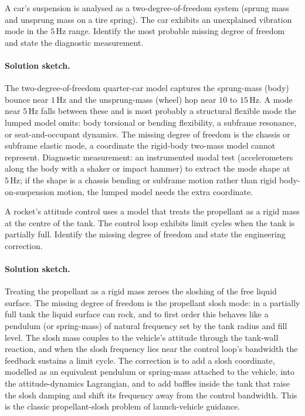 \begin{exercise}
A car's suspension is analysed as a two-degree-of-freedom system
(sprung mass and unsprung mass on a tire spring). The car exhibits an
unexplained vibration mode in the $5\,\si{\hertz}$ range. Identify
the most probable missing degree of freedom and state the
diagnostic measurement.

\paragraph{Solution sketch.} The two-degree-of-freedom quarter-car model
captures the sprung-mass (body) bounce near $1\,\si{\hertz}$ and the
unsprung-mass (wheel) hop near $10$ to $15\,\si{\hertz}$. A mode near
$5\,\si{\hertz}$ falls between these and is most probably a structural
flexible mode the lumped model omits: body torsional or bending
flexibility, a subframe resonance, or seat-and-occupant dynamics. The
missing degree of freedom is the chassis or subframe elastic mode, a
coordinate the rigid-body two-mass model cannot represent. Diagnostic
measurement: an instrumented modal test (accelerometers along the body
with a shaker or impact hammer) to extract the mode shape at
$5\,\si{\hertz}$; if the shape is a chassis bending or subframe motion
rather than rigid body-on-suspension motion, the lumped model needs the
extra coordinate.
\end{exercise}

\begin{exercise}
A rocket's attitude control uses a model that treats the propellant
as a rigid mass at the centre of the tank. The control loop exhibits
limit cycles when the tank is partially full. Identify the missing
degree of freedom and state the engineering correction.

\paragraph{Solution sketch.} Treating the propellant as a rigid mass
zeroes the sloshing of the free liquid surface. The missing degree of
freedom is the propellant slosh mode: in a partially full tank the
liquid surface can rock, and to first order this behaves like a pendulum
(or spring-mass) of natural frequency set by the tank radius and fill
level. The slosh mass couples to the vehicle's attitude through the
tank-wall reaction, and when the slosh frequency lies near the control
loop's bandwidth the feedback sustains a limit cycle. The correction is
to add a slosh coordinate, modelled as an equivalent pendulum or
spring-mass attached to the vehicle, into the attitude-dynamics
Lagrangian, and to add baffles inside the tank that raise the slosh
damping and shift its frequency away from the control bandwidth. This is
the classic propellant-slosh problem of launch-vehicle guidance.
\end{exercise}

